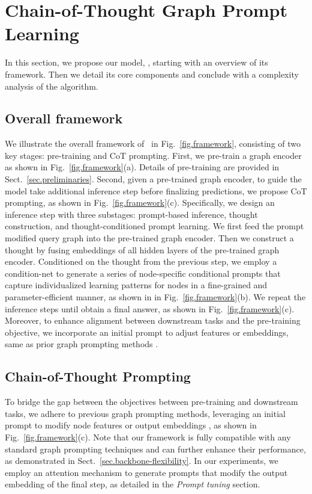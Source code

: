 \section{Chain-of-Thought Graph Prompt Learning}

In this section, we propose our model, \model, starting with an overview of its framework. Then we detail its core components and conclude with a complexity analysis of the algorithm.

\subsection{Overall framework}
We illustrate the overall framework of \model\ in Fig.~\ref{fig.framework}, consisting of two key stages: pre-training and CoT prompting. 
First, we pre-train a graph encoder as shown in Fig.~\ref{fig.framework}(a). %
Details of pre-training are provided in Sect.~\ref{sec.preliminaries}.
Second, given a pre-trained graph encoder, to guide the model take additional inference step before finalizing predictions, we propose CoT prompting, as shown in Fig.~\ref{fig.framework}(c). Specifically, we design an inference step with three substages: prompt-based inference, thought construction, and thought-conditioned prompt learning. We first feed the prompt modified query graph into the pre-trained graph encoder. Then we construct a thought by fusing embeddings of all hidden layers of the pre-trained graph encoder. Conditioned on the thought from the previous step, we employ a condition-net to generate a series of node-specific conditional prompts that capture individualized learning patterns for nodes in a fine-grained and parameter-efficient manner, as shown in in Fig.~\ref{fig.framework}(b). We repeat the inference steps until obtain a final answer, as shown in Fig.~\ref{fig.framework}(c). Moreover, to enhance alignment between downstream tasks and the pre-training objective, we incorporate an initial prompt to adjust features or embeddings, same as prior graph prompting methods \cite{liu2023graphprompt,fang2024universal}.

\subsection{Chain-of-Thought Prompting}
To bridge the gap between the objectives between pre-training and downstream tasks, we adhere to previous graph prompting methods, leveraging an initial prompt to modify node features \cite{sun2022gppt,fang2024universal} or output embeddings \cite{liu2023graphprompt,yu2024non}, as shown in Fig.~\ref{fig.framework}(c). Note that our framework is fully compatible with any standard graph prompting techniques and can further enhance their performance, as demonstrated in Sect.~\ref{sec.backbone-flexibility}. In our experiments, we employ an attention mechanism to generate prompts that modify the output embedding of the final step, as detailed in the \textit{Prompt tuning} section.

